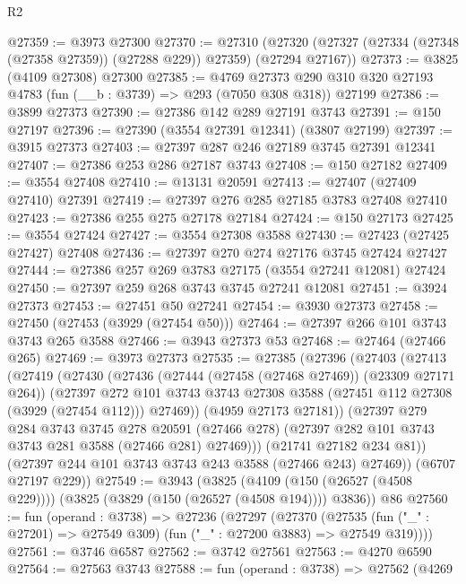 \begin{lexlean}{R2}
\begin{coremodule}
@27359 := @3973 @27300
@27370 := @27310
    (@27320 (@27327 (@27334 (@27348 (@27358 @27359)) (@27288 @229)) @27359) (@27294 @27167))
@27373 := @3825 (@4109 @27308) @27300
@27385 := @4769
    @27373
    @290
    @310
    @320
    @27193
    @4783
    (fun (__b : @3739) => @293 (@7050 @308 @318))
    @27199
@27386 := @3899 @27373
@27390 := @27386 @142 @289 @27191 @3743
@27391 := @150 @27197
@27396 := @27390 (@3554 @27391 @12341) (@3807 @27199)
@27397 := @3915 @27373
@27403 := @27397 @287 @246 @27189 @3745 @27391 @12341
@27407 := @27386 @253 @286 @27187 @3743
@27408 := @150 @27182
@27409 := @3554 @27408
@27410 := @13131 @20591
@27413 := @27407 (@27409 @27410) @27391
@27419 := @27397 @276 @285 @27185 @3783 @27408 @27410
@27423 := @27386 @255 @275 @27178 @27184
@27424 := @150 @27173
@27425 := @3554 @27424
@27427 := @3554 @27308 @3588
@27430 := @27423 (@27425 @27427) @27408
@27436 := @27397 @270 @274 @27176 @3745 @27424 @27427
@27444 := @27386 @257 @269 @3783 @27175 (@3554 @27241 @12081) @27424
@27450 := @27397 @259 @268 @3743 @3745 @27241 @12081
@27451 := @3924 @27373
@27453 := @27451 @50 @27241
@27454 := @3930 @27373
@27458 := @27450 (@27453 (@3929 (@27454 @50)))
@27464 := @27397 @266 @101 @3743 @3743 @265 @3588
@27466 := @3943 @27373 @53
@27468 := @27464 (@27466 @265)
@27469 := @3973 @27373
@27535 := @27385
    (@27396
      (@27403
        (@27413
          (@27419
            (@27430
              (@27436
                (@27444 (@27458 (@27468 @27469)) (@23309 @27171 @264))
                (@27397
                  @272
                  @101
                  @3743
                  @3743
                  @27308
                  @3588
                  (@27451 @112 @27308 (@3929 (@27454 @112)))
                  @27469))
              (@4959 @27173 @27181))
            (@27397
              @279
              @284
              @3743
              @3745
              @278
              @20591
              (@27466 @278)
              (@27397 @282 @101 @3743 @3743 @281 @3588 (@27466 @281) @27469)))
          (@21741 @27182 @234 @81))
        (@27397 @244 @101 @3743 @3743 @243 @3588 (@27466 @243) @27469))
      (@6707 @27197 @229))
@27549 := @3943
    (@3825 (@4109 (@150 (@26527 (@4508 @229)))) (@3825 (@3829 (@150 (@26527 (@4508 @194)))) @3836))
    @86
@27560 := fun (operand : @3738) =>
  @27236
    (@27297
      (@27370
        (@27535 (fun ("_" : @27201) => @27549 @309) (fun ("_" : @27200 @3883) => @27549 @319))))
@27561 := @3746 @6587
@27562 := @3742 @27561
@27563 := @4270 @6590
@27564 := @27563 @3743
@27588 := fun (operand : @3738) =>
  @27562
    (@4269

\end{coremodule}
\end{lexlean}
